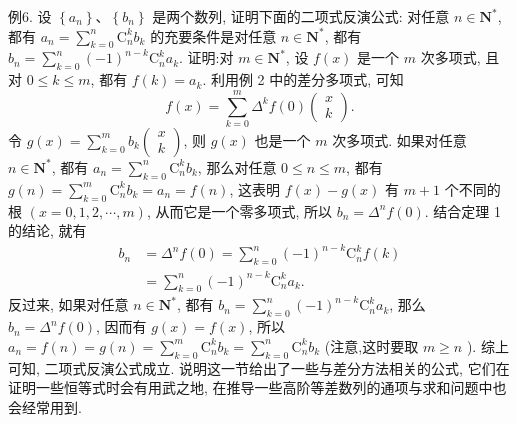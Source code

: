 例6. 设 $\left\{a_n\right\} 、\left\{b_n\right\}$ 是两个数列, 证明下面的二项式反演公式: 对任意 $n \in \mathbf{N}^*$, 都有 $a_n=\sum_{k=0}^n \mathrm{C}_n^k b_k$ 的充要条件是对任意 $n \in \mathbf{N}^*$, 都有 $b_n=\sum_{k=0}^n(-1)^{n-k} \mathrm{C}_n^k a_k$.
证明:对 $m \in \mathbf{N}^*$, 设 $f(x)$ 是一个 $m$ 次多项式, 且对 $0 \leqslant k \leqslant m$, 都有 $f(k)=a_k$.
利用例 2 中的差分多项式, 可知
$$
f(x)=\sum_{k=0}^m \Delta^k f(0)\left(\begin{array}{l}
x \\
k
\end{array}\right) .
$$
令 $g(x)=\sum_{k=0}^m b_k\left(\begin{array}{l}x \\ k\end{array}\right)$, 则 $g(x)$ 也是一个 $m$ 次多项式.
如果对任意 $n \in \mathbf{N}^*$, 都有 $a_n=\sum_{k=0}^n \mathrm{C}_n^k b_k$, 那么对任意 $0 \leqslant n \leqslant m$, 都有 $g(n)=\sum_{k=0}^m \mathrm{C}_n^k b_k=a_n=f(n)$, 这表明 $f(x)-g(x)$ 有 $m+1$ 个不同的根 $(x=0,1,2, \cdots, m)$, 从而它是一个零多项式, 所以 $b_n=\Delta^n f(0)$. 结合定理 1 的结论, 就有
$$
\begin{aligned}
b_n & =\Delta^n f(0)=\sum_{k=0}^n(-1)^{n-k} \mathrm{C}_n^k f(k) \\
& =\sum_{k=0}^n(-1)^{n-k} \mathrm{C}_n^k a_k .
\end{aligned}
$$
反过来, 如果对任意 $n \in \mathbf{N}^*$, 都有 $b_n=\sum_{k=0}^n(-1)^{n-k} \mathrm{C}_n^k a_k$, 那么 $b_n= \Delta^n f(0)$, 因而有 $g(x)=f(x)$, 所以 $a_n=f(n)=g(n)=\sum_{k=0}^m \mathrm{C}_n^k b_k= \sum_{k=0}^n \mathrm{C}_n^k b_k$ (注意,这时要取 $m \geqslant n$ ).
综上可知, 二项式反演公式成立.
说明这一节给出了一些与差分方法相关的公式, 它们在证明一些恒等式时会有用武之地, 在推导一些高阶等差数列的通项与求和问题中也会经常用到.


